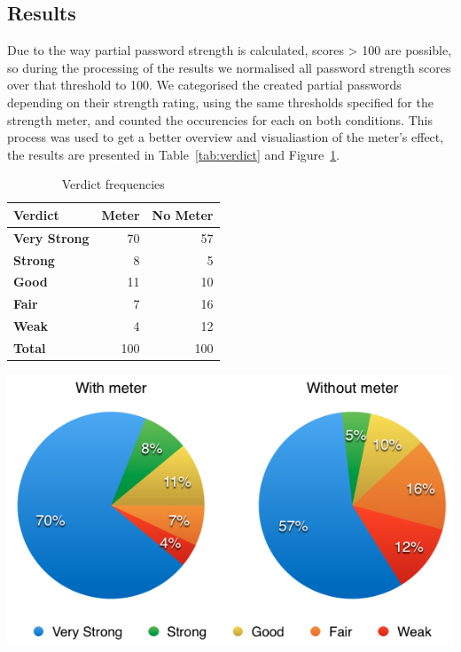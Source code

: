   \subsection{Results}
    \label{ssec:useability_results}
    Due to the way partial password strength is calculated, scores > 100 are possible, so during the processing of the results we normalised all password strength scores over that threshold to 100. We categorised the created partial passwords depending on their strength rating, using the same thresholds specified for the strength meter, and counted the occurencies for each on both conditions. This process was used to get a better overview and visualiastion of the meter's effect, the results are presented in Table~\ref{tab:verdict} and Figure~\ref{fig:verdict}.

    \begin{table}[htpb]
      \hspace*{-1.5cm}
      \begin{minipage}[b]{0.3\linewidth}
        \centering
        \scriptsize
        \begin{tabular}{ l r r}
          \toprule
          \textbf{Verdict} & \textbf{Meter} & \textbf{No Meter} \\ \midrule
          \textbf{Very Strong} & 70 & 57 \\
          \textbf{Strong} & 8 & 5 \\
          \textbf{Good} & 11 & 10 \\
          \textbf{Fair} & 7 & 16 \\
          \textbf{Weak} & 4 & 12 \\ \midrule
          \textbf{Total} & 100 & 100 \\ \bottomrule
        \end{tabular}
          \caption{Verdict frequencies}
          \label{tab:verdict}
      \end{minipage}\hfill
      \begin{minipage}[b]{0.7\linewidth}
        \centering
        \includegraphics[width=\linewidth]{Images/results-str}
        \label{fig:verdict}
      \end{minipage}
    \end{table}

